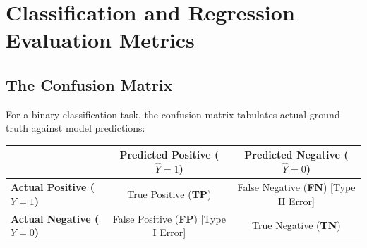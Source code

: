 \section{Classification and Regression Evaluation Metrics}
\label{sec:evaluation_metrics}

\subsection{The Confusion Matrix}
For a binary classification task, the confusion matrix tabulates actual ground truth against model predictions:
\begin{table}[htbp]
\centering
\small
\begin{tabular}{|l|c|c|}
\hline
& \textbf{Predicted Positive ($\hat{Y}=1$)} & \textbf{Predicted Negative ($\hat{Y}=0$)} \\
\hline
\textbf{Actual Positive ($Y=1$)} & True Positive (\textbf{TP}) & False Negative (\textbf{FN}) [Type II Error] \\
\hline
\textbf{Actual Negative ($Y=0$)} & False Positive (\textbf{FP}) [Type I Error] & True Negative (\textbf{TN}) \\
\hline
\end{tabular}
\end{table}

